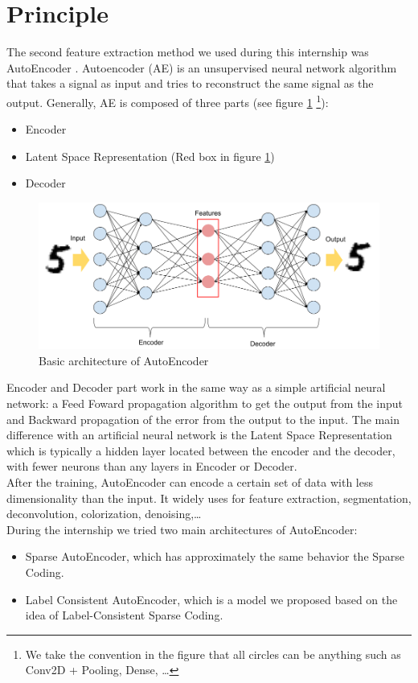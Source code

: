\section{Principle}
The second feature extraction method we used during this internship was AutoEncoder \cite{Rumelhart:1986:LIR:104279.104293}. Autoencoder (AE) is an unsupervised neural network algorithm that takes a signal as input and tries to reconstruct the same signal as the output. Generally, AE is composed of three parts (see figure \ref{fig:AE} \footnote{We take the convention in the figure that all circles can be anything such as Conv2D + Pooling, Dense, \dots}):
\begin{itemize}
 \item Encoder 
 \item Latent Space Representation (Red box in figure \ref{fig:AE})
 \item Decoder
\end{itemize}
 
\begin{figure}[h]
 \centering
 \includegraphics[scale=0.5]{AutoEncoder.png}
 \caption{Basic architecture of AutoEncoder}
 \label{fig:AE}
\end{figure}
Encoder and Decoder part work in the same way as a simple artificial neural network: a Feed Foward propagation algorithm to get the output from the input and Backward propagation of the error from the output to the input. The main difference with an artificial neural network is the Latent Space Representation which is typically a hidden layer located between the encoder and the decoder, with fewer neurons than any layers in Encoder or Decoder.\\
After the training, AutoEncoder can encode a certain set of data with less dimensionality than the input. It widely uses for feature extraction, segmentation, deconvolution, colorization, denoising,\dots\\
During the internship we tried two main architectures of AutoEncoder:
\begin{itemize}
 \item Sparse AutoEncoder, which has approximately the same behavior the Sparse Coding.
 \item Label Consistent AutoEncoder, which is a model we proposed based on the idea of Label-Consistent Sparse Coding.
\end{itemize}

